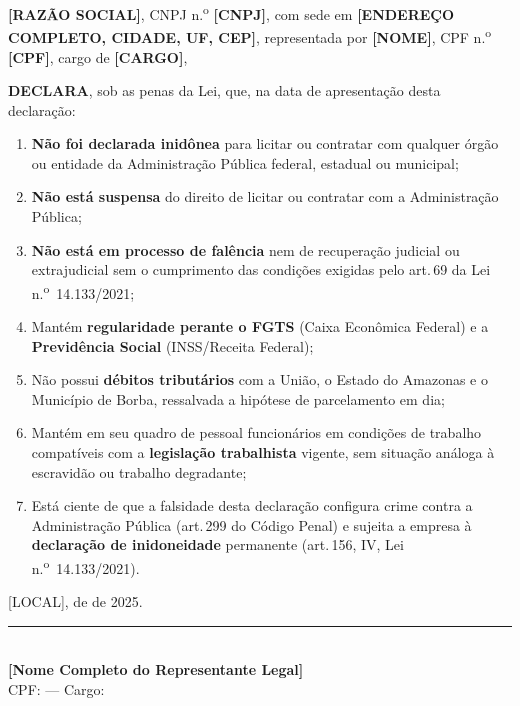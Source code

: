\documentclass[12pt,a4paper]{article}
\newcommand{\art}[1]{art.\,#1}
\newcommand{\blank}[1]{\underline{\hspace{#1}}}
\newcommand{\exercicio}{2025}
\begin{document}
\bigskip
\noindent\textbf{[RAZÃO SOCIAL]}, CNPJ n.\textsuperscript{o} \textbf{[CNPJ]},
com sede em \textbf{[ENDEREÇO COMPLETO, CIDADE, UF, CEP]}, representada por
\textbf{[NOME]}, CPF n.\textsuperscript{o} \textbf{[CPF]}, cargo de
\textbf{[CARGO]},

\bigskip
\noindent\textbf{DECLARA}, sob as penas da Lei, que, na data de apresentação
desta declaração:

\begin{enumerate}
  \item \textbf{Não foi declarada inidônea} para licitar ou contratar com
    qualquer órgão ou entidade da Administração Pública federal, estadual
    ou municipal;

  \item \textbf{Não está suspensa} do direito de licitar ou contratar com
    a Administração Pública;

  \item \textbf{Não está em processo de falência} nem de recuperação
    judicial ou extrajudicial sem o cumprimento das condições exigidas pelo
    \art{69} da Lei n.\textsuperscript{o}~14.133/2021;

  \item Mantém \textbf{regularidade perante o FGTS} (Caixa Econômica
    Federal) e a \textbf{Previdência Social} (INSS/Receita Federal);

  \item Não possui \textbf{débitos tributários} com a União, o Estado do
    Amazonas e o Município de Borba, ressalvada a hipótese de parcelamento
    em dia;

  \item Mantém em seu quadro de pessoal funcionários em condições de
    trabalho compatíveis com a \textbf{legislação trabalhista} vigente,
    sem situação análoga à escravidão ou trabalho degradante;

  \item Está ciente de que a falsidade desta declaração configura crime
    contra a Administração Pública (\art{299} do Código Penal) e sujeita
    a empresa à \textbf{declaração de inidoneidade} permanente (\art{156},
    IV, Lei n.\textsuperscript{o}~14.133/2021).
\end{enumerate}

\vspace{1.2cm}
\begin{center}
  [LOCAL], \blank{0.8cm} de \blank{3cm} de \exercicio.\\[1.0cm]
  \rule{9cm}{0.5pt}\\[3pt]
  \textbf{[Nome Completo do Representante Legal]}\\
  \small CPF: \blank{3cm} --- Cargo: \blank{3cm}
\end{center}
\end{document}
